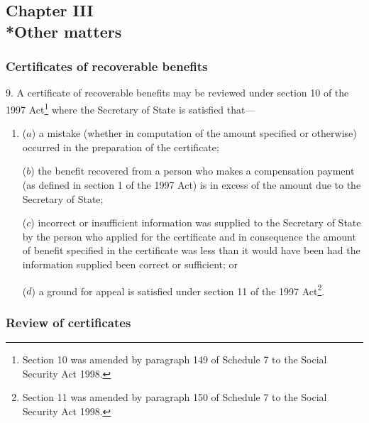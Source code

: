 \documentclass[12pt,a4paper]{article}
\begin{document}
\subsection[Chapter III --- Other matters]{Chapter III\\*Other matters}

\subsubsection[9. Certificates of recoverable benefits]{Certificates of recoverable benefits}

\renewcommand\parthead{--- Part II Chapter III}

9.  A certificate of recoverable benefits may be reviewed under section 10 of the 1997 Act\footnote{\frenchspacing Section 10 was amended by paragraph 149 of Schedule 7 to the Social Security Act 1998.} where the Secretary of State is satisfied that—
\begin{enumerate}\item[]
($a$) a mistake (whether in computation of the amount specified or otherwise) occurred in the preparation of the certificate;

($b$) the benefit recovered from a person who makes a compensation payment (as defined in section 1 of the 1997 Act) is in excess of the amount due to the Secretary of State;

($c$) incorrect or insufficient information was supplied to the Secretary of State by the person who applied for the certificate and in consequence the amount of benefit specified in the certificate was less than it would have been had the information supplied been correct or sufficient; or

($d$) a ground for appeal is satisfied under section 11 of the 1997 Act\footnote{\frenchspacing Section 11 was amended by paragraph 150 of Schedule 7 to the Social Security Act 1998.}.
\end{enumerate}

\subsubsection[9ZA. Review of certificates]{Review of certificates}
\end{document}
